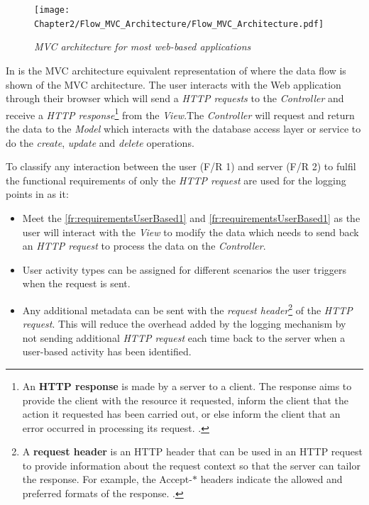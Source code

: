 \begin{figure}[!htb] %
	\centering %
	\texttt{[image: Chapter2/Flow\_MVC\_Architecture/Flow\_MVC\_Architecture.pdf]}
	\caption[MVC architecture for most web-based applications]
	{\textit{MVC architecture for most web-based applications \cite{Gu2010}}}\label{fig:ch2_flowMVC_Architecture}
\end{figure}

In  is the MVC architecture equivalent representation of  where the data flow is shown of the MVC architecture. The user interacts with the Web application through their browser which will send a \textit{HTTP requests} to the \textit{Controller} and receive a \textit{HTTP response}\footnote{An \textbf{HTTP response} is made by a server to a client. The response aims to provide the client with the resource it requested, inform the client that the action it requested has been carried out, or else inform the client that an error occurred in processing its request. \cite{IBM2021a}.} from the \textit{View}.The \textit{Controller} will request and return the data to the \textit{Model} which interacts with the database access layer or service to do the \textit{create}, \textit{update} and \textit{delete} operations.\par To classify any interaction between the user (F/R 1) and server (F/R 2) to fulfil the functional requirements of  only the \textit{HTTP request} are used for the logging points in  as it:

\begin{itemize}
	\item Meet the \ref{fr:requirementsUserBased1} and \ref{fr:requirementsUserBased1} as the user will interact with the \textit{View} to modify the data which needs to send back an \textit{HTTP request} to process the data on the \textit{Controller}.
	\item User activity types can be assigned for different scenarios the user triggers when the request is sent. 
	\item Any additional metadata can be sent with the \textit{request header}\footnote{A \textbf{request header} is an HTTP header that can be used in an HTTP request to provide information about the request context so that the server can tailor the response. For example, the Accept-$\ast$ headers indicate the allowed and preferred formats of the response. \cite{Mozilla2022}.} of the \textit{HTTP request}. This will reduce the overhead added by the logging mechanism by not sending additional \textit{HTTP request} each time back to the server when a user-based activity has been identified.
\end{itemize}

